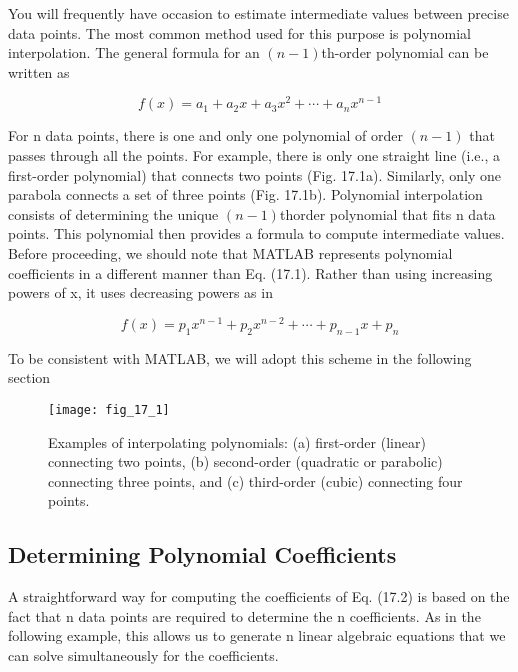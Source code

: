 \documentclass[../main.tex]{subfiles}
\begin{document}
You will frequently have occasion to estimate intermediate values between precise data
points. The most common method used for this purpose is polynomial interpolation. The
general formula for an $(n - 1)$th-order polynomial can be written as

\begin{equation}
    \tag{17.1}
    f(x)=a_{1}+a_{2} x+a_{3} x^{2}+\cdots+a_{n} x^{n-1}
    \end{equation}

    For n data points, there is one and only one polynomial of order $(n - 1)$ that passes through
    all the points. For example, there is only one straight line (i.e., a first-order polynomial)
    that connects two points (Fig. 17.1a). Similarly, only one parabola connects a set of three
    points (Fig. 17.1b). Polynomial interpolation consists of determining the unique $(n - 1)$thorder polynomial that fits n data points. This polynomial then provides a formula to
    compute intermediate values.\\
    Before proceeding, we should note that MATLAB represents polynomial coefficients
    in a different manner than Eq. (17.1). Rather than using increasing powers of x, it uses decreasing powers as in

    \begin{equation}
        \tag{17.2}
        f(x)=p_{1} x^{n-1}+p_{2} x^{n-2}+\cdots+p_{n-1} x+p_{n}
        \end{equation}

        To be consistent with MATLAB, we will adopt this scheme in the following section

        \begin{figure}[H]
            \centering
            \texttt{[image: fig\_17\_1]}
           \caption{\textsf{Examples of interpolating polynomials: (a) first-order (linear) connecting two points,
           (b) second-order (quadratic or parabolic) connecting three points, and (c) third-order (cubic)
           connecting four points.}}\label{fig:fig_17_1}
        \end{figure}

        \subsection{Determining Polynomial Coefficients}
        A straightforward way for computing the coefficients of Eq. (17.2) is based on the fact that
        n data points are required to determine the n coefficients. As in the following example, this
        allows us to generate n linear algebraic equations that we can solve simultaneously for the
        coefficients.
\end{document}
